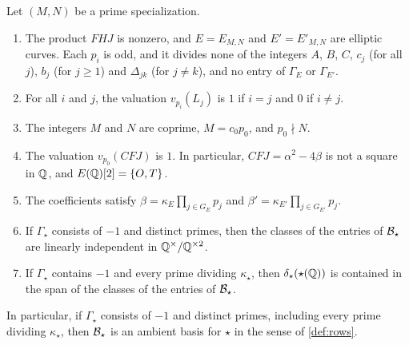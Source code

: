\begin{lemma}\label{lem:prime-spec-basic}
Let $(M,N)$ be a prime specialization.
\begin{enumerate}[label=(\alph*),ref=(\alph*)]
\item\label{item:psb-nonzero} The product $FHJ$ is nonzero, and $E=E_{M,N}$ and $E'=E'_{M,N}$ are elliptic curves. Each $p_i$ is odd, and it divides none of the integers $A$, $B$, $C$, $c_j$ (for all $j$), $b_j$ (for $j\ge1$) and $\Delta_{jk}$ (for $j\ne k$), and no entry of $\Gamma_E$ or $\Gamma_{E'}$.
\item\label{item:psb-valuations} For all $i$ and $j$, the valuation $v_{p_i}(L_j)$ is $1$ if $i=j$ and $0$ if $i\ne j$.
\item\label{item:psb-gcd} The integers $M$ and $N$ are coprime, $M=c_0p_0$, and $p_0\nmid N$.
\item\label{item:psb-torsion} The valuation $v_{p_0}(CFJ)$ is $1$. In particular, $CFJ=\alpha^2-4\beta$ is not a square in $\mathbb Q$, and $E(\mathbb Q)[2]=\{O,T\}$.
\item\label{item:psb-beta} The coefficients satisfy $\beta=\kappa_E\prod_{j\in G_E}p_j$ and $\beta'=\kappa_{E'}\prod_{j\in G_{E'}}p_j$.
\item\label{item:psb-independent} If $\Gamma_\star$ consists of $-1$ and distinct primes, then the classes of the entries of $\mathcal B_\star$ are linearly independent in $\mathbb Q^{\times}/\mathbb Q^{\times2}$.
\item\label{item:psb-support} If $\Gamma_\star$ contains $-1$ and every prime dividing $\kappa_\star$, then $\delta_\star(\star(\mathbb Q))$ is contained in the span of the classes of the entries of $\mathcal B_\star$.
\end{enumerate}
In particular, if $\Gamma_\star$ consists of $-1$ and distinct primes, including every prime dividing $\kappa_\star$, then $\mathcal B_\star$ is an ambient basis for $\star$ in the sense of \cref{def:rows}.
\end{lemma}

